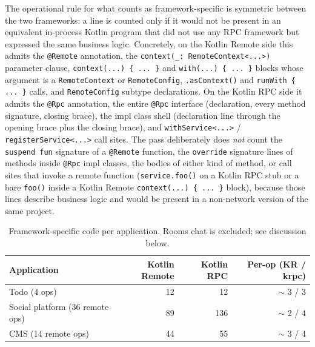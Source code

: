 \documentclass[a4paper,11pt,oneside]{article}
\newcommand{\kotlini}[1]{\texttt{#1}}
\begin{document}
The operational rule for what counts as framework-specific is symmetric between the two
frameworks: a line is counted only if it would not be present in an equivalent in-process
Kotlin program that did not use any RPC framework but expressed the same business logic.
Concretely, on the Kotlin Remote side this admits the \kotlini{@Remote} annotation, the
\kotlini{context(_: RemoteContext<...>)} parameter clause, \kotlini{context(...) \{ ... \}}
and \kotlini{with(...) \{ ... \}} blocks whose argument is a \kotlini{RemoteContext} or
\kotlini{RemoteConfig}, \kotlini{.asContext()} and \kotlini{runWith \{ ... \}} calls, and
\kotlini{RemoteConfig} subtype declarations. On the Kotlin RPC side it admits the
\kotlini{@Rpc} annotation, the entire \kotlini{@Rpc} interface (declaration, every method
signature, closing brace), the impl class shell (declaration line through the opening brace
plus the closing brace), and \kotlini{withService<...>} / \kotlini{registerService<...>}
call sites. The pass deliberately does \emph{not} count the \kotlini{suspend fun} signature
of a \kotlini{@Remote} function, the \kotlini{override} signature lines of methods inside
\kotlini{@Rpc} impl classes, the bodies of either kind of method, or call sites that invoke
a remote function (\kotlini{service.foo()} on a Kotlin RPC stub or a bare \kotlini{foo()}
inside a Kotlin Remote \kotlini{context(...) \{ ... \}} block), because those lines describe
business logic and would be present in a non-network version of the same project.

\begin{table}[!h]
  \begin{center}
    \begin{tabular}{lrrr}
      \toprule
      Application & Kotlin Remote & Kotlin RPC & Per-op (KR / krpc) \\
      \midrule
      Todo (4 ops)                    &  12 &  12 & ${\sim}$ 3 / 3 \\
      Social platform (36 remote ops) &  89 & 136 & ${\sim}$ 2 / 4 \\
      CMS (14 remote ops)             &  44 &  55 & ${\sim}$ 3 / 4 \\
      \bottomrule
    \end{tabular}
    \caption{Framework-specific code per application. Rooms chat is excluded; see discussion below.}\label{loc_table}
  \end{center}
\end{table}
\end{document}
